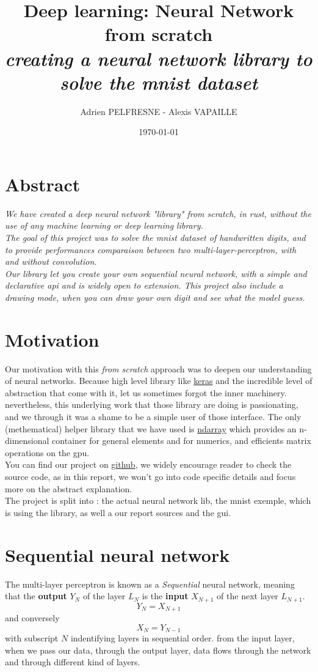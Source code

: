 \documentclass[a4paper, twocolumn, twoside]{article}
\title{Deep learning: Neural Network from scratch\\
\textit{creating a neural network library to solve the mnist dataset}}
\author{Adrien PELFRESNE - Alexis VAPAILLE}
\date{\today}
\begin{document}
	\onecolumn
    \maketitle
	\twocolumn
	\section{Abstract}
	\textit{We have created a deep neural network "library" from scratch, in rust, without the use of any machine learning or deep learning library.\\
	The goal of this project was to solve the mnist dataset of handwritten digits, and to provide performances comparaison between
	two multi-layer-perceptron, with and without convolution.\\
	Our library let you create your own sequential neural network, with a simple and declarative api and is widely open to extension.
	This project also include a drawing mode, when you can draw your own digit and see what the model guess.
	}

	\section{Motivation}
	Our motivation with this \textit{from scratch} approach was to deepen our understanding of neural networks.
	Because high level library like \href{https://keras.io/}{keras} and the incredible level of abstraction that come with it,
	let us sometimes forgot the inner machinery. nevertheless,
	this underlying work that those library are doing is passionating, and we through it was a shame to be a simple user of those interface.
	The only (methematical) helper library that we have used is \href{https://crates.io/crates/ndarray}{ndarray}
	which provides an n-dimensional container for general elements and for numerics, and efficients matrix operations on the gpu.\\
	You can find our project on \href{https://github.com/dirdr/neural_network_from_scratch}{github}, we widely encourage reader to check the source code,
	as in this report, we won't go into code specific details and focus more on the abstract explanation.\\
	The project is split into : the actual neural network lib, the mnist exemple, which is using the library, as well a our report sources and the gui.

	\section{Sequential neural network}
	The multi-layer perceptron is known  as a \textit{Sequential} neural network, meaning that the \textbf{output}
	$Y_N$ of the layer $L_N$ is the \textbf{input} $X_{N+1}$ of the next layer $L_{N+1}$.\\
	$$
	Y_{N} = X_{N+1}
	$$
	and conversely
	$$
	X_{N} = Y_{N-1}
	$$
	with subscript $N$ indentifying layers in sequential order.
	from the input layer, when we pass our data, through the output layer, data flows through the network and through different kind of layers.
\end{document}
